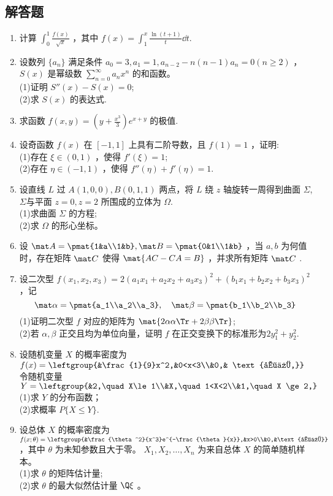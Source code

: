 \subsection{解答题}
\begin{enumerate}
\item 计算 $\displaystyle \int_{0}^{1}\frac{f(x)}{\sqrt{x}}$ ，其中  $\displaystyle f(x)=\int_{1}^{x}\frac{\ln(t+1)}{t}\dd{t}$.
\item 设数列 $\{a_n\}$ 满足条件 $a_0=3,a_1=1,a_{n-2}-n(n-1)a_n=0(n\ge 2)$ ， $S(x)$ 是幂级数 $\displaystyle \sum_{n=0}^\infty a_nx^n$ 的和函数。\\
(1)证明 $S''(x)-S(x)=0$;\\
(2)求 $S(x)$ 的表达式.
\item 求函数 $\displaystyle f(x,y)=(y+\frac{x^3}{3})e^{x+y}$ 的极值.
\item 设奇函数 $f(x)$ 在 $[-1,1]$ 上具有二阶导数，且 $f(1)=1$ ，证明:\\
(1)存在 $\xi \in(0,1)$  ，使得 $f'(\xi)=1$;\\
(2)存在 $\eta \in (-1,1)$ ，使得 $f''(\eta)+f'(\eta)=1$.
\item 设直线 $L$ 过 $A(1,0,0),B(0,1,1)$ 两点，将 $L$ 绕 $z$ 轴旋转一周得到曲面 $\Sigma$, $\Sigma$与平面 $z=0,z=2$  所围成的立体为 $\Omega$.\\
(1)求曲面 $\Sigma$ 的方程;\\
(2)求 $\Omega$ 的形心坐标。
\item 设 $\mat A=\pmat{1&a\\1&b},\mat B=\pmat{0&1\\1&b}$ ，当 $a,b$ 为何值时，存在矩阵 $\mat C$ 使得 $\mat {AC-CA=B}$ ，并求所有矩阵 $\mat C$  .
\item  设二次型 $f(x_1,x_2,x_3)=2(a_1x_1+a_2x_2+a_3x_3)^2+(b_1x_1+b_2x_2+b_3x_3)^2$  ，记\begin{equation}
\mat \alpha=\pmat{a_1\\a_2\\a_3},\quad
\mat \beta=\pmat{b_1\\b_2\\b_3}~
\end{equation}
(1)证明二次型 $f$ 对应的矩阵为 $\mat {2\alpha\alpha \Tr +2\beta\beta \Tr}$;\\
(2)若 $\alpha,\beta$ 正交且均为单位向量，证明 $f$ 在正交变换下的标准形为$2y_1^2+y_2^2$.
\item 设随机变量 $X$ 的概率密度为 $f(x)=\leftgroup{&\frac{1}{9}x^2,&0<x<3\\&0,& \text{其他,}}$令随机变量 $Y=\leftgroup{&2,\quad X\le 1\\&X,\quad 1<X<2\\&1,\quad X \ge 2,}$\\
(1)求 $Y$ 的分布函数；\\
(2)求概率 $P\{X \le Y\}$.
\item 设总体 $X$ 的概率密度为 $f(x;\theta)=\leftgroup{&\frac{\theta^2}{x^3}e^{-\frac{\theta}{x}},&x>0\\&0,&\text{其他}}$ ，其中 $\theta$ 为未知参数且大于零。 $X_1,X_2,\dots,X_n$   为来自总体 $X$ 的简单随机样本。\\
(1)求 $\theta$ 的矩阵估计量;\\
(2)求 $\theta$ 的最大似然估计量 $\Q \xi$ 。
\end{enumerate}